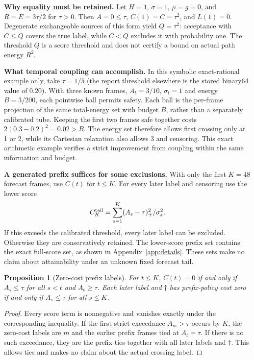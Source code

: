 \documentclass[11pt]{article}
\theoremstyle{noteplain}
\newtheorem{proposition}{Proposition}
\newcommand{\dd}{\dagger}
\begin{document}
\textbf{Why equality must be retained.} Let $H=1$, $\sigma=1$, $\mu=g=0$, and $R=E=3\tau/2$ for $\tau>0$. Then $A=0\le\tau$, $C(1)=\overline C=\tau^2$, and $L(1)=0$. Degenerate exchangeable sources of this form yield $Q=\tau^2$: acceptance with $C\le Q$ covers the true label, while $C<Q$ excludes it with probability one. The threshold $Q$ is a score threshold and does not certify a bound on actual path energy $R^2$.

\textbf{What temporal coupling can accomplish.}
In this symbolic exact-rational example only, take $\tau=1/5$ (the report threshold elsewhere is the stored binary64 value of $0.20$). With three known frames, $A_t=3/10$, $\sigma_t=1$ and energy $B=3/200$, each pointwise ball permits safety. Each ball is the per-frame projection of the same total-energy set with budget $B$, rather than a separately calibrated tube. Keeping the first two frames safe together costs $2(0.3-0.2)^2=0.02>B$. The energy set therefore allows first crossing only at 1 or 2, while its Cartesian relaxation also allows 3 and censoring. This exact arithmetic example verifies a strict improvement from coupling within the same information and budget.

\textbf{A generated prefix suffices for some exclusions.}
With only the first $K=48$ forecast frames, use $C(t)$ for $t\le K$. For every later label and censoring use the lower score
\[
 C_K^{\rm tail}=\sum_{s=1}^K (A_s-\tau)_+^2/\sigma_s^2 .
\]
If this exceeds the calibrated threshold, every later label can be excluded. Otherwise they are conservatively retained. The lower-score prefix set contains the exact full-score set, as shown in Appendix~\ref{app:details}. These sets make no claim about attainability under an unknown fixed forecast tail.

\begin{proposition}[Zero-cost prefix labels]\label{prop:zero}
For $t\le K$, $C(t)=0$ if and only if $A_s\le\tau$ for all $s<t$ and $A_t\ge\tau$. Each later label and $\dd$ has prefix-policy cost zero if and only if $A_s\le\tau$ for all $s\le K$.
\end{proposition}
\begin{proof}
Every score term is nonnegative and vanishes exactly under the corresponding inequality. If the first strict exceedance $A_m>\tau$ occurs by $K$, the zero-cost labels are $m$ and the earlier prefix frames tied at $A_t=\tau$. If there is no such exceedance, they are the prefix ties together with all later labels and $\dd$. This allows ties and makes no claim about the actual crossing label.
\end{proof}
\end{document}

